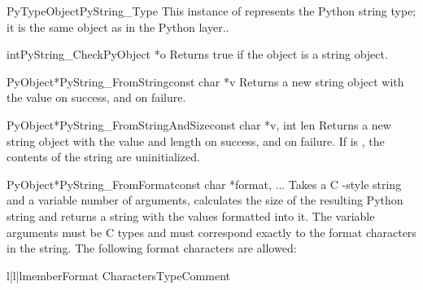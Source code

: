 \documentclass{manual}
\begin{document}
\begin{cvardesc}{PyTypeObject}{PyString_Type}
This instance of  represents the Python string
type; it is the same object as  in the Python
layer..
\end{cvardesc}

\begin{cfuncdesc}{int}{PyString_Check}{PyObject *o}
Returns true if the object  is a string object.
\end{cfuncdesc}

\begin{cfuncdesc}{PyObject*}{PyString_FromString}{const char *v}
Returns a new string object with the value  on success, and
\NULL{} on failure.
\end{cfuncdesc}

\begin{cfuncdesc}{PyObject*}{PyString_FromStringAndSize}{const char *v,
                                                         int len}
Returns a new string object with the value  and length
 on success, and \NULL{} on failure.  If  is \NULL{},
the contents of the string are uninitialized.
\end{cfuncdesc}

\begin{cfuncdesc}{PyObject*}{PyString_FromFormat}{const char *format, ...}
Takes a C -style  string and a variable
number of arguments, calculates the size of the resulting Python
string and returns a string with the values formatted into it.  The
variable arguments must be C types and must correspond exactly to the
format characters in the  string.  The following format
characters are allowed:
\begin{tableiii}{l|l|l}{member}{Format Characters}{Type}{Comment}
\end{tableiii}
\end{cfuncdesc}
\end{document}
